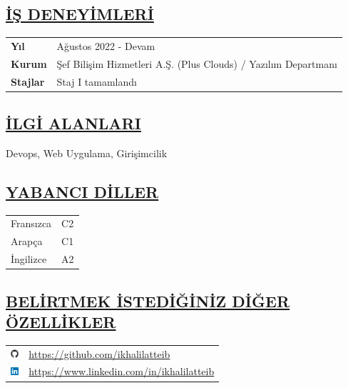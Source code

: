 \subsection*{\underline{\textbf{İŞ DENEYİMLERİ}}}
\begin{tabular}{l@{\bfseries: }l}
\textbf{Yıl} & Ağustos 2022 - Devam \\
\textbf{Kurum} & Şef Bilişim Hizmetleri A.Ş. (Plus Clouds) / Yazılım Departmanı \\
\textbf{Stajlar} & Staj I tamamlandı \\
\end{tabular}

\subsection*{\underline{\textbf{İLGİ ALANLARI}}}
Devops, Web Uygulama, Girişimcilik

\subsection*{\underline{\textbf{YABANCI DİLLER}}}
\begin{tabular}{l@{\bfseries : }l}
Fransızca & C2 \\
Arapça & C1 \\
İngilizce & A2 \\
\end{tabular}

\subsection*{\underline{\textbf{BELİRTMEK İSTEDİĞİNİZ DİĞER ÖZELLİKLER}}}
\begin{tabular}{l@{}l}
\href{https://github.com/ikhalilatteib}{\includegraphics[width=0.3cm]{images/github}} & \href{https://github.com/ikhalilatteib}{https://github.com/ikhalilatteib} \\
\href{https://www.linkedin.com/in/ikhalilatteib/}{\includegraphics[width=0.3cm]{images/linkedIn}} & \href{https://www.linkedin.com/in/ikhalilatteib/}{https://www.linkedin.com/in/ikhalilatteib} \\
\end{tabular}
